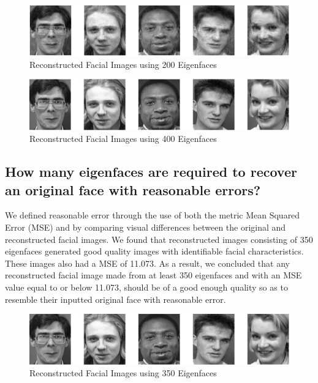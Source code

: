 \documentclass[letterpaper,12pt]{article}
\begin{document}
\begin{figure}[htp]
    \centering
    \includegraphics[width=15cm]{faces200.png}
    \caption{Reconstructed Facial Images using 200 Eigenfaces}
    \label{faces200}
\end{figure}

\begin{figure}[htp]
    \centering
    \includegraphics[width=15cm]{faces400.png}
    \caption{Reconstructed Facial Images using 400 Eigenfaces}
    \label{faces400}
\end{figure}




\subsection{How many eigenfaces are required to recover an original face with reasonable errors?}\label{Q2.2}

We defined reasonable error through the use of both the metric Mean Squared Error (MSE) and by comparing visual differences between the original and reconstructed facial images. We found that reconstructed images consisting of 350 eigenfaces generated good quality images with identifiable facial characteristics. These images also had a MSE of 11.073. As a result, we concluded that any reconstructed facial image made from at least 350 eigenfaces and with an MSE value equal to or below 11.073, should be of a good enough quality so as to resemble their inputted original face with reasonable error. 

\begin{figure}[htp]
    \centering
    \includegraphics[width=15cm]{faces350.png}
    \caption{Reconstructed Facial Images using 350 Eigenfaces}
    \label{faces350}
\end{figure}
\end{document}

